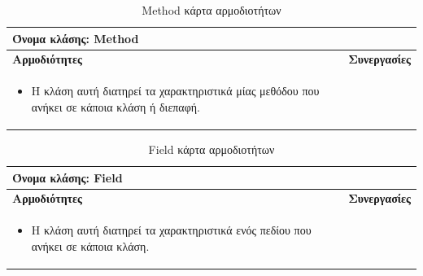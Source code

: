 \begin{table}[H]
    \centering
    \begin{tabular}{|p{5cm}|p{5cm}|}
        \hline
        \multicolumn{2}{|l|}{Όνομα κλάσης: Method} \\
        \hline
        \textbf{Αρμοδιότητες} & \textbf{Συνεργασίες} \\
        \hline
        \begin{itemize}
            \item Η κλάση αυτή διατηρεί τα χαρακτηριστικά μίας μεθόδου που ανήκει σε κάποια κλάση ή διεπαφή.
        \end{itemize} &    
        \\
        \hline
    \end{tabular}
    \label{tab:MethodCRC}
    \caption{Method κάρτα αρμοδιοτήτων}
\end{table}
\begin{table}[H]
    \centering
    \begin{tabular}{|p{5cm}|p{5cm}|}
        \hline
        \multicolumn{2}{|l|}{Όνομα κλάσης: Field} \\
        \hline
        \textbf{Αρμοδιότητες} & \textbf{Συνεργασίες} \\
        \hline
        \begin{itemize}
            \item Η κλάση αυτή διατηρεί τα χαρακτηριστικά ενός πεδίου που ανήκει σε κάποια κλάση.
        \end{itemize} &   
        \\
        \hline
    \end{tabular}
    \label{tab:FieldCRC}
    \caption{Field κάρτα αρμοδιοτήτων}
\end{table}
